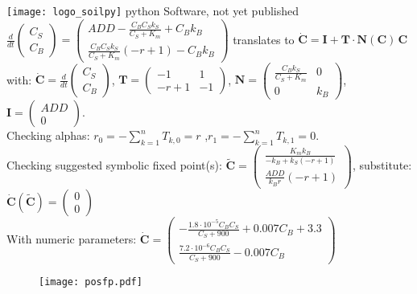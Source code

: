 \documentclass[final,hyperref={pdfpagelabels=false}, professionalmath, mathserif, 11pt]{beamer}
\begin{document}
\begin{frame}
\begin{columns}
\begin{column}{.48\textwidth}
\begin{minipage}[T]{.95\textwidth}
\begin{block}{
	  \texttt{[image: logo\_soilpy]} 
	  \hspace{1cm}
	  python Software, not yet published 
	  }
$\frac{d}{d{t}}\left(\begin{matrix}C_{S}\\C_{B}\end{matrix}\right)=\left(\begin{matrix}ADD - \frac{C_{B} C_{S} k_{S}}{C_{S} + K_{m}} + C_{B} k_{B}\\\frac{C_{B} C_{S} k_{S}}{C_{S} + K_{m}} \left(- r + 1\right) - C_{B} k_{B}\end{matrix}\right) $
translates to 
$ \mathbf{\dot{C}}=\mathbf{I + T\cdot N(C)\, C} $\\
with: $\mathbf{\dot{C}}=\frac{d}{d{t}}\left(\begin{matrix}C_{S}\\C_{B}\end{matrix}\right)$,
$\mathbf{T}=\left(\begin{matrix}-1&  1\\- r + 1 & -1\end{matrix}\right)$,
$\mathbf{N}=\left(\begin{matrix}\frac{C_{B} k_{S}}{C_{S} + K_{m}} & 0\\0 & k_{B}\end{matrix}\right) \text{}$,
$\mathbf{I}=\left(\begin{matrix}ADD\\0\end{matrix}\right)$.\\ 
Checking alphas:
$ r_{0}=-\sum_{k=1}^{n}T_{k,0}=r $ ,$ r_{1}=-\sum_{k=1}^{n}T_{k,1}=0 $.\\
Checking suggested symbolic fixed point(s):
$ \mathbf{\tilde{C}}=\left(\begin{matrix}\frac{K_{m} k_{B}}{- k_{B} + k_{S} \left(- r + 1\right)}\\\frac{ADD}{k_{B} r} \left(- r + 1\right)\end{matrix}\right)$, substitute:
$ \mathbf{\dot{C}}(\mathbf{\tilde{C}})=\left(\begin{matrix}0\\0\end{matrix}\right) $\\
With numeric parameters:
$ \mathbf{\dot{C}}=\left(\begin{matrix}- \frac{1.8 \cdot 10^{-5} C_{B} C_{S}}{C_{S} + 900} + 0.007 C_{B} + 3.3\\\frac{7.2 \cdot 10^{-6} C_{B} C_{S}}{C_{S} + 900} - 0.007 C_{B}\end{matrix}\right) $
	\begin{figure}
	  \texttt{[image: posfp.pdf]}

\end{figure}
\end{block}
\end{minipage}
\end{column}
\end{columns}
\end{frame}
\end{document}
